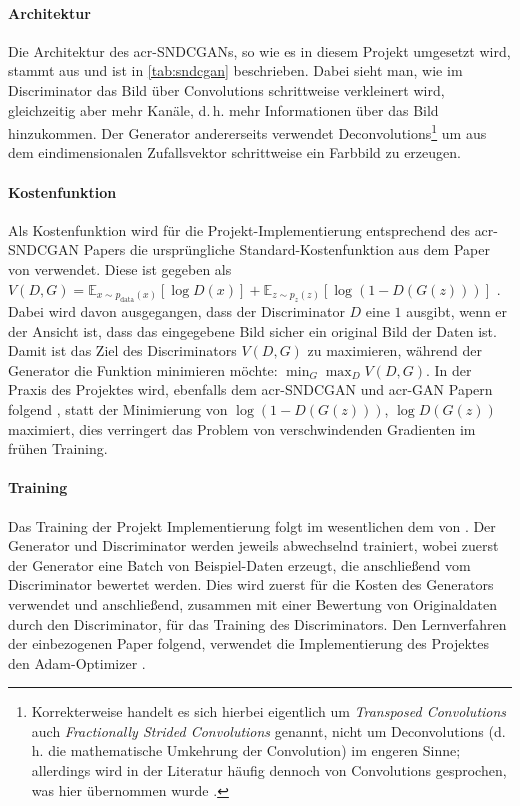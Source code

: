 \paragraph{Architektur} Die Architektur des \gls{acr-SNDCGAN}s, so wie es in
diesem Projekt umgesetzt wird, stammt aus 
\cite{kurach2018gan} und ist in \cref{tab:sndcgan} beschrieben. Dabei sieht man,
wie im Discriminator das Bild über Convolutions schrittweise verkleinert wird,
gleichzeitig aber mehr Kanäle, d.\,h. mehr Informationen über das Bild
hinzukommen. Der Generator andererseits verwendet
Deconvolutions\footnote{Korrekterweise handelt es sich hierbei eigentlich um
\emph{Transposed Convolutions} auch \emph{Fractionally Strided Convolutions}
genannt, nicht um Deconvolutions (d.\,h. die mathematische Umkehrung der
Convolution) im engeren Sinne; allerdings wird in der Literatur häufig dennoch
von Convolutions gesprochen, was hier übernommen wurde \cites[vgl.][S.
20]{dumoulin2016guide}[vgl.][S. 4]{radford2015unsupervised}.} um aus dem
eindimensionalen Zufallsvektor schrittweise ein Farbbild zu erzeugen.

\paragraph{Kostenfunktion} Als Kostenfunktion wird für die Projekt-Implementierung entsprechend des
\gls{acr-SNDCGAN} Papers die ursprüngliche Standard-Kostenfunktion aus dem Paper von
\citeauthor{goodfellow2014generative} \cite{goodfellow2014generative} verwendet. Diese ist
gegeben als $V(D, G) = \mathbb{E}_{x \sim p_{\text{data}}(x)} [\log D(x)] +
\mathbb{E}_{z \sim p_{z}(z)} [\log (1-D(G(z)))]$ \cite[S.
3]{goodfellow2014generative}. Dabei wird davon ausgegangen, dass der
Discriminator $D$ eine $1$ ausgibt, wenn er der Ansicht ist, dass das
eingegebene Bild sicher ein original Bild der Daten ist. Damit ist das Ziel des
Discriminators $V(D,G)$ zu maximieren, während der Generator die Funktion
minimieren möchte: $\min_{G} \max_{D} V(D,G)$. In der Praxis des Projektes wird,
ebenfalls dem \gls{acr-SNDCGAN} und \gls{acr-GAN} Papern folgend \cites[S.
3]{goodfellow2014generative}[S. 6]{miyato2018spectral}, statt der Minimierung
von $\log(1-D(G(z)))$, $\log D(G(z))$ maximiert, dies verringert das Problem von
verschwindenden Gradienten im frühen Training.

\paragraph{Training} Das Training der Projekt Implementierung folgt im
wesentlichen dem von \citeauthor{goodfellow2014generative}
\cite{goodfellow2014generative}. Der Generator und Discriminator werden jeweils
abwechselnd trainiert, wobei zuerst der Generator eine Batch von Beispiel-Daten
erzeugt, die anschließend vom Discriminator bewertet werden. Dies wird zuerst
für die Kosten des Generators verwendet und anschließend, zusammen mit einer
Bewertung von Originaldaten durch den Discriminator, für das Training des
Discriminators. Den Lernverfahren der einbezogenen Paper
\cite{radford2015unsupervised,miyato2018spectral,kurach2018gan} folgend,
verwendet die Implementierung des
Projektes den Adam-Optimizer \cite{kingma2014adam}.

